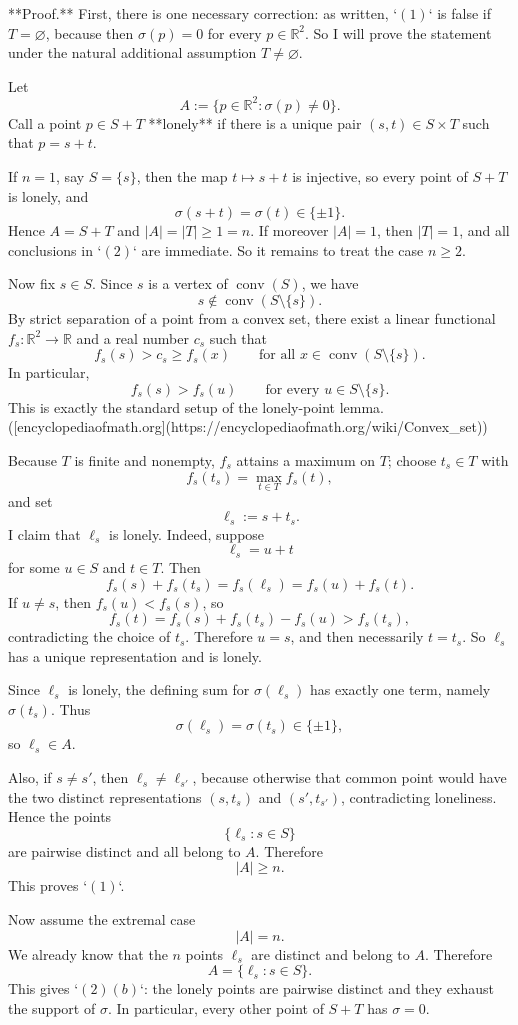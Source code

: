 **Proof.** First, there is one necessary correction: as written, `$(1)$` is false if $T=\varnothing$, because then $\sigma(p)=0$ for every $p\in\mathbb R^2$. So I will prove the statement under the natural additional assumption $T\neq\varnothing$.

Let
\[
A:=\{p\in\mathbb R^2:\sigma(p)\neq 0\}.
\]
Call a point $p\in S+T$ **lonely** if there is a unique pair $(s,t)\in S\times T$ such that $p=s+t$.

If $n=1$, say $S=\{s\}$, then the map $t\mapsto s+t$ is injective, so every point of $S+T$ is lonely, and
\[
\sigma(s+t)=\sigma(t)\in\{\pm1\}.
\]
Hence $A=S+T$ and $|A|=|T|\ge 1=n$. If moreover $|A|=1$, then $|T|=1$, and all conclusions in `$(2)$` are immediate. So it remains to treat the case $n\ge 2$.

Now fix $s\in S$. Since $s$ is a vertex of $\operatorname{conv}(S)$, we have
\[
s\notin \operatorname{conv}(S\setminus\{s\}).
\]
By strict separation of a point from a convex set, there exist a linear functional $f_s:\mathbb R^2\to\mathbb R$ and a real number $c_s$ such that
\[
f_s(s)>c_s\ge f_s(x)\qquad\text{for all }x\in \operatorname{conv}(S\setminus\{s\}).
\]
In particular,
\[
f_s(s)>f_s(u)\qquad\text{for every }u\in S\setminus\{s\}.
\]
This is exactly the standard setup of the lonely-point lemma. ([encyclopediaofmath.org](https://encyclopediaofmath.org/wiki/Convex_set))

Because $T$ is finite and nonempty, $f_s$ attains a maximum on $T$; choose $t_s\in T$ with
\[
f_s(t_s)=\max_{t\in T} f_s(t),
\]
and set
\[
\ell_s:=s+t_s.
\]
I claim that $\ell_s$ is lonely. Indeed, suppose
\[
\ell_s=u+t
\]
for some $u\in S$ and $t\in T$. Then
\[
f_s(s)+f_s(t_s)=f_s(\ell_s)=f_s(u)+f_s(t).
\]
If $u\neq s$, then $f_s(u)<f_s(s)$, so
\[
f_s(t)=f_s(s)+f_s(t_s)-f_s(u)>f_s(t_s),
\]
contradicting the choice of $t_s$. Therefore $u=s$, and then necessarily $t=t_s$. So $\ell_s$ has a unique representation and is lonely.

Since $\ell_s$ is lonely, the defining sum for $\sigma(\ell_s)$ has exactly one term, namely $\sigma(t_s)$. Thus
\[
\sigma(\ell_s)=\sigma(t_s)\in\{\pm1\},
\]
so $\ell_s\in A$.

Also, if $s\neq s'$, then $\ell_s\neq \ell_{s'}$, because otherwise that common point would have the two distinct representations $(s,t_s)$ and $(s',t_{s'})$, contradicting loneliness. Hence the points
\[
\{\ell_s:s\in S\}
\]
are pairwise distinct and all belong to $A$. Therefore
\[
|A|\ge n.
\]
This proves `$(1)$`.

Now assume the extremal case
\[
|A|=n.
\]
We already know that the $n$ points $\ell_s$ are distinct and belong to $A$. Therefore
\[
A=\{\ell_s:s\in S\}.
\]
This gives `$(2)(b)$`: the lonely points are pairwise distinct and they exhaust the support of $\sigma$. In particular, every other point of $S+T$ has $\sigma=0$.

